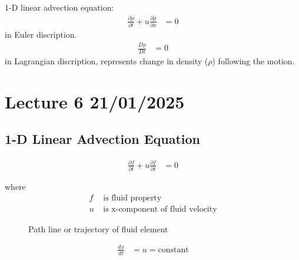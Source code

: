 \documentclass[fleqn,10pt]{SelfArx} %
\begin{document}
1-D linear advection equation:
\begin{align*}
	\frac{\partial \rho}{\partial t} + u\frac{\partial \rho}{\partial x} & = 0
\end{align*} in Euler discription.
\begin{align*}
	\frac{D\rho}{Dt} & = 0
\end{align*} in Lagrangian discription, represents change in density ($\rho$) following the motion.

\clearpage

\section{Lecture 6 21/01/2025}
\subsection{1-D Linear Advection Equation}
\begin{align*}
	\frac{\partial f}{\partial t} + u \frac{\partial f}{\partial t} & = 0 \tag{6.1} \label{eq:advectioneq}
\end{align*}

where
\begin{align*}
	f & \text{ is fluid property}                \\
	u & \text{ is x-component of fluid velocity}
\end{align*}

\begin{figure}[ht!]
	\centering
	\caption{Path line or trajectory of fluid element}
	\label{fig:pathline}
\end{figure}

\begin{align*}
	\frac{dx}{dt} & = u = \text{constant} \tag{6.2} \label{eq:dxdt-constant}
\end{align*}
\end{document}
